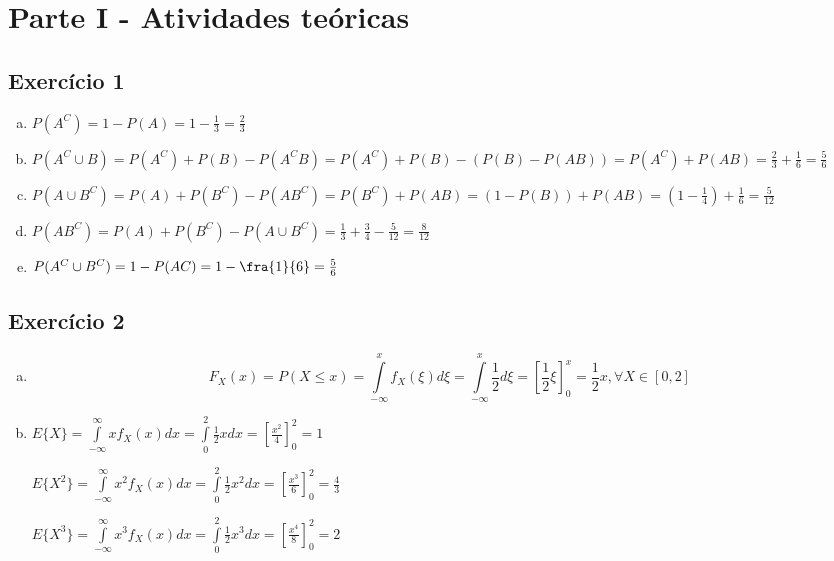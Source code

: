 \documentclass[a4paper, 12pt]{article}
\begin{document}
\section*{Parte I - Atividades teóricas}

\subsection*{Exercício 1}

\begin{enumerate}[a)]
\item
$P(A^C) = 1 - P(A) = 1 - \frac{1}{3} = \frac{2}{3}$

\item
$P(A^C \cup B) = P(A^C) + P(B) - P(A^CB) = P(A^C) + P(B) - (P(B) - P(AB)) = P(A^C) + P(AB) = \frac{2}{3} + \frac{1}{6} = \frac{5}{6}$

\item
$P(A \cup B^C) = P(A) + P(B^C) - P(AB^C) = P(B^C) + P(AB) = (1 - P(B)) + P(AB) = (1 - \frac{1}{4}) + \frac{1}{6} = \frac{5}{12}$

\item
$P(AB^C) = P(A) + P(B^C) - P(A \cup B^C) = \frac{1}{3} + \frac{3}{4} - \frac{5}{12} = \frac{8}{12}$

\item
    $P(A^C \cup B^C) = 1 - P(AC) = 1 - \fra{1}{6} = \frac{5}{6}$

\end{enumerate}

\subsection*{Exercício 2}

\begin{enumerate}[a)]
\item
$$
    F_X(x) = P(X \leq x) = \int\limits_{-\infty}^x f_X(\xi) d\xi = \int\limits_{-\infty}^x \frac{1}{2} d\xi = \left[ \frac{1}{2}\xi \right]^x_0 = \frac{1}{2} x, \forall X \in [0, 2]
$$

\item
$E\{X\} = \int\limits_{-\infty}^{\infty} xf_X(x)dx = \int\limits_0^2 \frac{1}{2}x dx = \left[\frac{x^2}{4}\right]^2_0 = 1$

$E\{X^2\} = \int\limits_{-\infty}^{\infty} x^2f_X(x)dx = \int\limits_0^2 \frac{1}{2}x^2 dx = \left[\frac{x^3}{6}\right]^2_0 = \frac{4}{3}$

$E\{X^3\} = \int\limits_{-\infty}^{\infty} x^3f_X(x)dx = \int\limits_0^2 \frac{1}{2}x^3 dx = \left[\frac{x^4}{8}\right]^2_0 = 2$
\end{enumerate}
\end{document}
